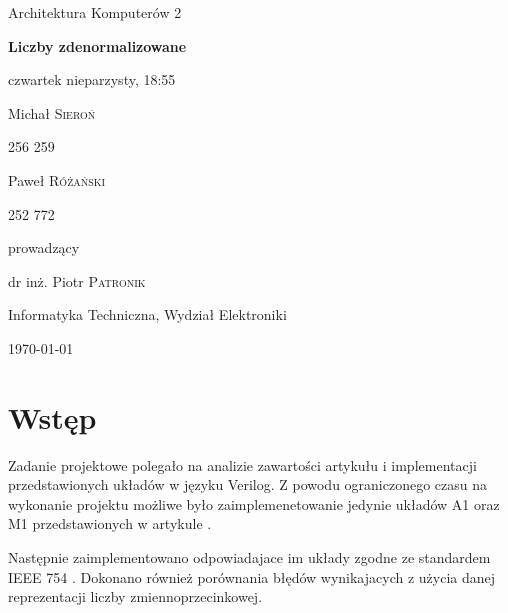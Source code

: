 \documentclass{article}
\begin{document}
\begin{titlepage}
	\clearpage
	\thispagestyle{empty}
    \centering
    
	{\LARGE Architektura Komputerów 2 \par}
	
	\vspace{1.5cm}
	
	{\huge\bfseries Liczby zdenormalizowane\par}
	
	\vspace{1.5cm}
	{\large czwartek nieparzysty, 18:55\par}

	\vspace{1cm}
    \parbox{0.4\linewidth}{
	    \centering
	    {\Large Michał \textsc{Sieroń}\par}
	    {\large 256 259\par}
	}
    \hfill
    \parbox{0.4\linewidth}{
	    \centering
	    {\Large Paweł \textsc{Różański}\par}
	    {\large 252 772\par}
	}

	\vspace{1.5cm}
	{\large prowadzący\par}
	{\large dr inż. Piotr \textsc{Patronik}\par}
    
	\vfill

	{\large Informatyka Techniczna, Wydział Elektroniki\par}
	\vspace{0.5cm}
	{\large \today\par}
	\clearpage
\end{titlepage}

\tableofcontents
\newpage

\section{Wstęp}
Zadanie projektowe polegało na analizie zawartości artykułu i implementacji przedstawionych układów w języku Verilog.
Z powodu ograniczonego czasu na wykonanie projektu możliwe było zaimplemenetowanie jedynie układów A1 oraz M1 przedstawionych w artykule \cite{art:old}.

Następnie zaimplementowano odpowiadajace im układy zgodne ze standardem IEEE 754 \cite{art:ieee754}.
Dokonano również porównania błędów wynikajacych z użycia danej reprezentacji liczby zmiennoprzecinkowej. 
\end{document}
